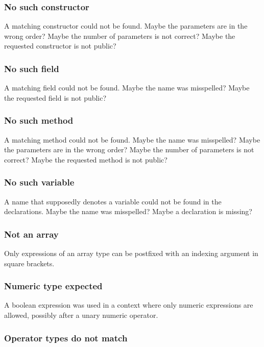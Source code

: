 \subsubsection{No such constructor}

A matching constructor could not be found. Maybe the
parameters are in the wrong order? Maybe the number of
parameters is not correct? Maybe the requested constructor
is not public?

\subsubsection{No such field}

A matching field could not be found.
Maybe the name was misspelled?
Maybe the requested field is not public?

\subsubsection{No such method}

A matching method could not be found.
Maybe the name was misspelled? Maybe the
parameters are in the wrong order? Maybe the number of
parameters is not correct? Maybe the requested method
is not public?

\subsubsection{No such variable}

A name that supposedly denotes a variable could not be
found in the declarations. Maybe the name was misspelled?
Maybe a declaration is missing?

\subsubsection{Not an array}

Only expressions of an array type can be postfixed with
an indexing argument in square brackets.

\subsubsection{Numeric type expected}

A boolean expression was used in a context where
only numeric expressions are allowed, possibly
after a unary numeric operator.

\subsubsection{Operator types do not match}

